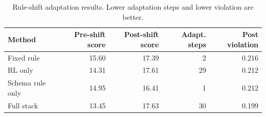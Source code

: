 \begin{table}[t]
  \centering
  \caption{Rule-shift adaptation results. Lower adaptation steps and lower violation are better.}
  \label{tab:rule_shift}
  \begin{tabular}{lrrrr}
    \toprule
    Method & Pre-shift score & Post-shift score & Adapt. steps & Post violation \\
    \midrule
    Fixed rule & 15.60 & 17.39 & 2 & 0.216 \\
    RL only & 14.31 & 17.61 & 29 & 0.212 \\
    Schema rule only & 14.95 & 16.41 & 1 & 0.212 \\
    Full stack & 13.45 & 17.63 & 30 & 0.199 \\
    \bottomrule
  \end{tabular}
\end{table}
